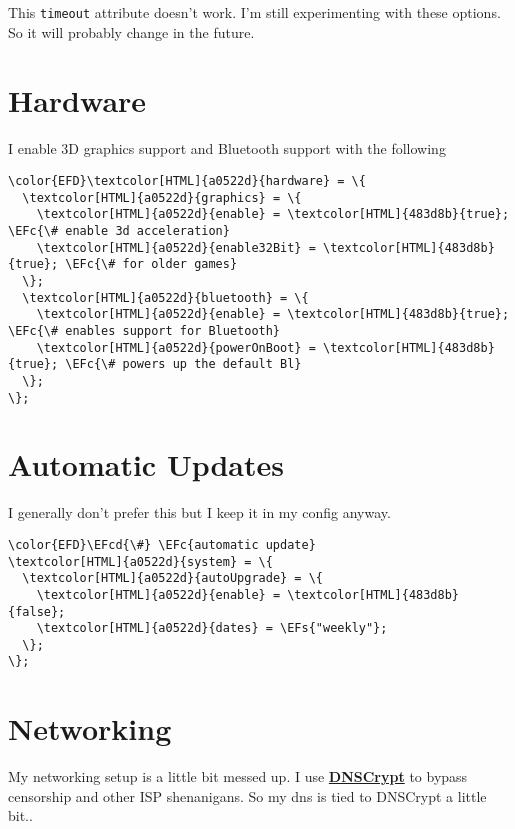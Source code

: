 \documentclass[14pt]{article}
\let\oldhref\href
\renewcommand{\href}[2]{\oldhref{#1}{\textbf{#2}}}
\newcommand{\EFc}[1]{\textcolor{EFc}{#1}} %
\newcommand{\EFcd}[1]{\textcolor{EFcd}{#1}} %
\newcommand{\EFs}[1]{\textcolor{EFs}{#1}} %
\begin{document}
This \texttt{timeout} attribute doesn't work. I'm still experimenting with these options. So it will probably change in the future.
\section{Hardware}
\label{sec:org479e6e4}
I enable 3D graphics support and Bluetooth support with the following
\begin{Code}
\begin{Verbatim}
\color{EFD}\textcolor[HTML]{a0522d}{hardware} = \{
  \textcolor[HTML]{a0522d}{graphics} = \{
    \textcolor[HTML]{a0522d}{enable} = \textcolor[HTML]{483d8b}{true}; \EFc{\# enable 3d acceleration}
    \textcolor[HTML]{a0522d}{enable32Bit} = \textcolor[HTML]{483d8b}{true}; \EFc{\# for older games}
  \};
  \textcolor[HTML]{a0522d}{bluetooth} = \{
    \textcolor[HTML]{a0522d}{enable} = \textcolor[HTML]{483d8b}{true}; \EFc{\# enables support for Bluetooth}
    \textcolor[HTML]{a0522d}{powerOnBoot} = \textcolor[HTML]{483d8b}{true}; \EFc{\# powers up the default Bl}
  \};
\};
\end{Verbatim}
\end{Code}
\section{Automatic Updates}
\label{sec:orgb7ceb32}
I generally don't prefer this but I keep it in my config anyway.
\begin{Code}
\begin{Verbatim}
\color{EFD}\EFcd{\#} \EFc{automatic update}
\textcolor[HTML]{a0522d}{system} = \{
  \textcolor[HTML]{a0522d}{autoUpgrade} = \{
    \textcolor[HTML]{a0522d}{enable} = \textcolor[HTML]{483d8b}{false};
    \textcolor[HTML]{a0522d}{dates} = \EFs{"weekly"};
  \};
\};
\end{Verbatim}
\end{Code}
\section{Networking}
\label{sec:org4ef6f97}
My networking setup is a little bit messed up. I use \href{https://www.dnscrypt.org/}{DNSCrypt} to bypass censorship and other ISP shenanigans. So my dns is tied to DNSCrypt a little bit..
\end{document}
